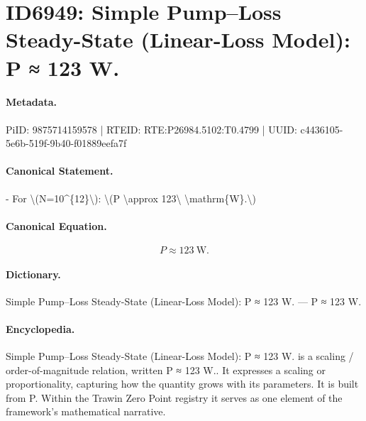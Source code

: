 \section*{ID6949: Simple Pump–Loss Steady-State (Linear-Loss Model): P ≈ 123 W.}
\paragraph{Metadata.}
PiID: 9875714159578 | RTEID: RTE:P26984.5102:T0.4799 | UUID: c4436105-5e6b-519f-9b40-f01889eefa7f

\paragraph{Canonical Statement.}
- For \textbackslash{}(N=10\textasciicircum{}\{12\}\textbackslash{}): \textbackslash{}(P \textbackslash{}approx 123\textbackslash{} \textbackslash{}mathrm\{W\}.\textbackslash{})

\paragraph{Canonical Equation.}
\[
P \approx 123\ \mathrm{W}.
\]

\paragraph{Dictionary.}
Simple Pump–Loss Steady-State (Linear-Loss Model): P ≈ 123 W. — P ≈ 123 W.

\paragraph{Encyclopedia.}
Simple Pump–Loss Steady-State (Linear-Loss Model): P ≈ 123 W. is a scaling / order-of-magnitude relation, written P ≈ 123 W.. It expresses a scaling or proportionality, capturing how the quantity grows with its parameters. It is built from P. Within the Trawin Zero Point registry it serves as one element of the framework's mathematical narrative.
